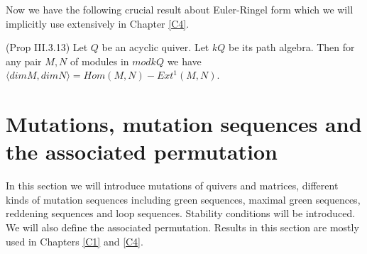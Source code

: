 \indent Now we have the following crucial result about Euler-Ringel form which we will implicitly use extensively in Chapter \ref{C4}.\\
\begin{theorem}
\cite{ASS06} \label{HE}(Prop III.3.13) Let $Q$ be an acyclic quiver. Let $kQ$ be its path algebra. Then for any pair $M,N$ of modules in $mod kQ$ we have $\langle dim M, dim N\rangle = Hom(M,N)-Ext^1(M,N)$.
\end{theorem}
\section{Mutations, mutation sequences and the associated permutation}
\indent In this section we will introduce mutations of quivers and matrices, different kinds of mutation sequences including green sequences, maximal green sequences, reddening sequences and loop sequences. Stability conditions will be introduced. We will also define the associated permutation. Results in this section are mostly used in Chapters \ref{C1} and \ref{C4}.\\
